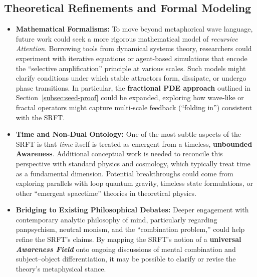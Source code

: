 \documentclass[12pt,a4paper]{article}
\begin{document}
\subsection{Theoretical Refinements and Formal Modeling}
\label{subsec:theoretical-refinements}
\begin{itemize}
    \item \textbf{Mathematical Formalisms:} 
    To move beyond metaphorical wave language, future work could seek a more rigorous mathematical model of \emph{recursive Attention}. Borrowing tools from dynamical systems theory, researchers could experiment with iterative equations or agent-based simulations that encode the “selective amplification” principle at various scales. Such models might clarify conditions under which stable attractors form, dissipate, or undergo phase transitions. In particular, the \textbf{fractional PDE approach} outlined in Section~\ref{subsec:seed-proof} could be expanded, exploring how wave-like or fractal operators might capture multi-scale feedback (``folding in'') consistent with the SRFT.  

    \item \textbf{Time and Non-Dual Ontology:}
    One of the most subtle aspects of the SRFT is that \emph{time} itself is treated as emergent from a timeless, \textbf{unbounded Awareness}. Additional conceptual work is needed to reconcile this perspective with standard physics and cosmology, which typically treat time as a fundamental dimension. Potential breakthroughs could come from exploring parallels with loop quantum gravity, timeless state formulations, or other “emergent spacetime” theories in theoretical physics.

    \item \textbf{Bridging to Existing Philosophical Debates:}
    Deeper engagement with contemporary analytic philosophy of mind, particularly regarding panpsychism, neutral monism, and the “combination problem,” could help refine the SRFT’s claims. By mapping the SRFT’s notion of a \textbf{universal \emph{Awareness Field}} onto ongoing discussions of mental combination and subject–object differentiation, it may be possible to clarify or revise the theory’s metaphysical stance.
\end{itemize}
\end{document}
